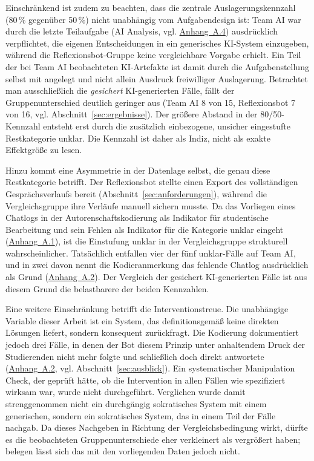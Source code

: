 Einschränkend ist zudem zu beachten, dass die zentrale Auslagerungskennzahl (80\,\% gegenüber
50\,\%) nicht unabhängig vom Aufgabendesign ist: Team AI war durch die letzte Teilaufgabe (\glqq AI
Analysis\grqq{}, vgl. \hyperref[app:szenarien]{Anhang~A.4}) ausdrücklich verpflichtet, die eigenen Entscheidungen in ein
generisches KI-System einzugeben, während die Reflexionsbot-Gruppe keine vergleichbare Vorgabe
erhielt. Ein Teil der bei Team AI beobachteten KI-Artefakte ist damit durch die Aufgabenstellung
selbst mit angelegt und nicht allein Ausdruck freiwilliger Auslagerung. Betrachtet man ausschließlich
die \emph{gesichert} KI-generierten Fälle, fällt der Gruppenunterschied deutlich geringer aus (Team
AI 8 von 15, Reflexionsbot 7 von 16, vgl. Abschnitt~\ref{sec:ergebnisse}). Der größere Abstand in der
80/50-Kennzahl entsteht erst durch die zusätzlich einbezogene, unsicher eingestufte Restkategorie
\glqq unklar\grqq{}. Die Kennzahl ist daher als Indiz, nicht als exakte Effektgröße zu lesen.

Hinzu kommt eine Asymmetrie in der Datenlage selbst, die genau diese Restkategorie betrifft. Der
Reflexionsbot stellte einen Export des vollständigen Gesprächsverlaufs bereit
(Abschnitt~\ref{sec:anforderungen}), während die Vergleichsgruppe ihre Verläufe manuell sichern
musste. Da das Vorliegen eines Chatlogs in der Autorenschaftskodierung als Indikator für studentische
Bearbeitung und sein Fehlen als Indikator für die Kategorie \glqq unklar\grqq{} eingeht
(\hyperref[app:kategoriensystem]{Anhang~A.1}), ist die Einstufung \glqq unklar\grqq{} in der
Vergleichsgruppe strukturell wahrscheinlicher. Tatsächlich entfallen vier der fünf
\glqq unklar\grqq{}-Fälle auf Team AI, und in zwei davon nennt die Kodieranmerkung das fehlende
Chatlog ausdrücklich als Grund (\hyperref[app:kodierungstabelle]{Anhang~A.2}). Der Vergleich der
gesichert KI-generierten Fälle ist aus diesem Grund die belastbarere der beiden Kennzahlen.

Eine weitere Einschränkung betrifft die Interventionstreue. Die unabhängige Variable dieser Arbeit ist
ein System, das definitionsgemäß keine direkten Lösungen liefert, sondern konsequent zurückfragt. Die
Kodierung dokumentiert jedoch drei Fälle, in denen der Bot diesem Prinzip unter anhaltendem Druck der
Studierenden nicht mehr folgte und schließlich doch direkt antwortete
(\hyperref[app:kodierungstabelle]{Anhang~A.2}, vgl. Abschnitt~\ref{sec:ausblick}). Ein systematischer
Manipulation Check, der geprüft hätte, ob die Intervention in allen Fällen wie spezifiziert wirksam
war, wurde nicht durchgeführt. Verglichen wurde damit strenggenommen nicht ein durchgängig
sokratisches System mit einem generischen, sondern ein sokratisches System, das in einem Teil der
Fälle nachgab. Da dieses Nachgeben in Richtung der Vergleichsbedingung wirkt, dürfte es die
beobachteten Gruppenunterschiede eher verkleinert als vergrößert haben; belegen lässt sich das mit den
vorliegenden Daten jedoch nicht.

